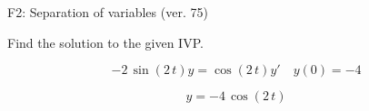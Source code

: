 \begin{exercise}
  \begin{exerciseTitle}F2: Separation of variables (ver. 75)\end{exerciseTitle}
  \begin{exerciseStatement}
    
Find the solution to the given IVP.

    
\[-2 \, \sin\left(2 \, t\right) y= \cos\left(2 \, t\right) y'\hspace{1em} y\left( 0 \right)= -4\]

  \end{exerciseStatement}
  \begin{exerciseAnswer}
    
\[y= -4 \, \cos\left(2 \, t\right)\]

  \end{exerciseAnswer}
\end{exercise}